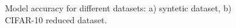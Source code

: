 \documentclass[runningheads]{llncs}
\begin{document}
\begin{figure}[ht]
    \begin{subfigure}[h]{0.5\linewidth}
    \caption{}
    \label{fig:epoch_size}
    \end{subfigure}
    \begin{subfigure}[h]{0.5\linewidth}
    \caption{}
    \label{fig:train_splines_every_epoch}
    \end{subfigure}
    \caption{%
    Model accuracy for different datasets: a) syntetic dataset, b) CIFAR-10 reduced dataset.}
    \label{fig:accuracy}
\end{figure}
 
\end{document}
